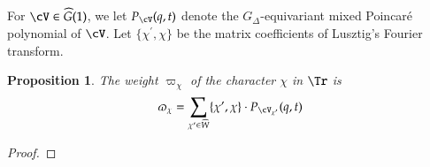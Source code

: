 \documentclass[12pt]{amsart}
\newtheorem{prop}[thm]{Proposition}
\theoremstyle{remark}
\begin{document}
For $\cV\in \widehat G(1)$, we let $P_\cV(q,t)$ denote the
$G_\Delta$-equivariant mixed Poincar\'e polynomial of $\cV$.  Let
$\{\chi^{\prime} ,\chi\}$ be the matrix coefficients of Lusztig's Fourier transform.
\begin{prop}\label{weight}
 The weight $\varpi_\chi$ of the
  character $\chi$ in $\Tr$ is
  \begin{equation*}
    \varpi_\chi=\sum_{\chi^{\prime} \in \widehat W }
    \{\chi^{\prime},\chi\}\cdot P_{\cV_{\chi^{\prime}}}(q,t)
  \end{equation*}
\end{prop}
\begin{proof}
% 


\end{proof}
\end{document}
